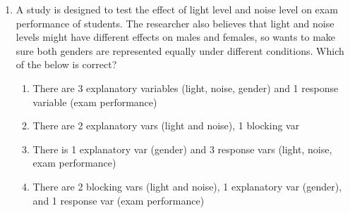 \documentclass[10pt]{article}\usepackage[]{graphicx}\usepackage[]{color}
\begin{document}
\begin{enumerate}
\item A study is designed to test the effect of light level and noise level on exam performance of students. The researcher also believes that light and noise levels might have different effects on males and females, so wants to make sure both genders are represented equally under different conditions. Which of the below is correct?

\begin{enumerate}
  \item There are 3 explanatory variables (light, noise, gender) and 1 response variable (exam performance)
    \item There are 2 explanatory vars (light and noise), 1 blocking var       
    \item There is 1 explanatory var (gender) and 3 response vars (light, noise, exam performance)
  \item There are 2 blocking vars (light and noise), 1 explanatory var (gender), and 1 response var (exam performance)
\end{enumerate}

\end{enumerate}
\end{document}
